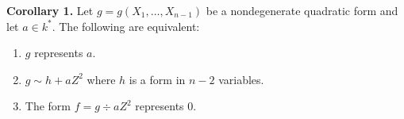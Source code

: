 \textbf{Corollary 1.} Let $g = g(X_1, \ldots, X_{n-1})$ be a nondegenerate quadratic form and let $a \in k^*$. The following are equivalent:
\begin{enumerate}
\item[(i)] $g$ represents $a$.
\item[(ii)] $g \sim h + aZ^2$ where $h$ is a form in $n-2$ variables.
\item[(iii)] The form $f = g \div aZ^2$ represents $0$.
\end{enumerate}
